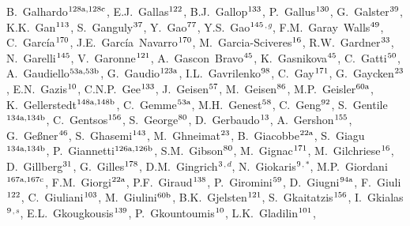\begin{flushleft}
B.~Galhardo$^\textrm{\scriptsize 128a,128c}$,
E.J.~Gallas$^\textrm{\scriptsize 122}$,
B.J.~Gallop$^\textrm{\scriptsize 133}$,
P.~Gallus$^\textrm{\scriptsize 130}$,
G.~Galster$^\textrm{\scriptsize 39}$,
K.K.~Gan$^\textrm{\scriptsize 113}$,
S.~Ganguly$^\textrm{\scriptsize 37}$,
Y.~Gao$^\textrm{\scriptsize 77}$,
Y.S.~Gao$^\textrm{\scriptsize 145}$$^{,g}$,
F.M.~Garay~Walls$^\textrm{\scriptsize 49}$,
C.~Garc\'ia$^\textrm{\scriptsize 170}$,
J.E.~Garc\'ia~Navarro$^\textrm{\scriptsize 170}$,
M.~Garcia-Sciveres$^\textrm{\scriptsize 16}$,
R.W.~Gardner$^\textrm{\scriptsize 33}$,
N.~Garelli$^\textrm{\scriptsize 145}$,
V.~Garonne$^\textrm{\scriptsize 121}$,
A.~Gascon~Bravo$^\textrm{\scriptsize 45}$,
K.~Gasnikova$^\textrm{\scriptsize 45}$,
C.~Gatti$^\textrm{\scriptsize 50}$,
A.~Gaudiello$^\textrm{\scriptsize 53a,53b}$,
G.~Gaudio$^\textrm{\scriptsize 123a}$,
I.L.~Gavrilenko$^\textrm{\scriptsize 98}$,
C.~Gay$^\textrm{\scriptsize 171}$,
G.~Gaycken$^\textrm{\scriptsize 23}$,
E.N.~Gazis$^\textrm{\scriptsize 10}$,
C.N.P.~Gee$^\textrm{\scriptsize 133}$,
J.~Geisen$^\textrm{\scriptsize 57}$,
M.~Geisen$^\textrm{\scriptsize 86}$,
M.P.~Geisler$^\textrm{\scriptsize 60a}$,
K.~Gellerstedt$^\textrm{\scriptsize 148a,148b}$,
C.~Gemme$^\textrm{\scriptsize 53a}$,
M.H.~Genest$^\textrm{\scriptsize 58}$,
C.~Geng$^\textrm{\scriptsize 92}$,
S.~Gentile$^\textrm{\scriptsize 134a,134b}$,
C.~Gentsos$^\textrm{\scriptsize 156}$,
S.~George$^\textrm{\scriptsize 80}$,
D.~Gerbaudo$^\textrm{\scriptsize 13}$,
A.~Gershon$^\textrm{\scriptsize 155}$,
G.~Ge\ss{}ner$^\textrm{\scriptsize 46}$,
S.~Ghasemi$^\textrm{\scriptsize 143}$,
M.~Ghneimat$^\textrm{\scriptsize 23}$,
B.~Giacobbe$^\textrm{\scriptsize 22a}$,
S.~Giagu$^\textrm{\scriptsize 134a,134b}$,
P.~Giannetti$^\textrm{\scriptsize 126a,126b}$,
S.M.~Gibson$^\textrm{\scriptsize 80}$,
M.~Gignac$^\textrm{\scriptsize 171}$,
M.~Gilchriese$^\textrm{\scriptsize 16}$,
D.~Gillberg$^\textrm{\scriptsize 31}$,
G.~Gilles$^\textrm{\scriptsize 178}$,
D.M.~Gingrich$^\textrm{\scriptsize 3}$$^{,d}$,
N.~Giokaris$^\textrm{\scriptsize 9}$$^{,*}$,
M.P.~Giordani$^\textrm{\scriptsize 167a,167c}$,
F.M.~Giorgi$^\textrm{\scriptsize 22a}$,
P.F.~Giraud$^\textrm{\scriptsize 138}$,
P.~Giromini$^\textrm{\scriptsize 59}$,
D.~Giugni$^\textrm{\scriptsize 94a}$,
F.~Giuli$^\textrm{\scriptsize 122}$,
C.~Giuliani$^\textrm{\scriptsize 103}$,
M.~Giulini$^\textrm{\scriptsize 60b}$,
B.K.~Gjelsten$^\textrm{\scriptsize 121}$,
S.~Gkaitatzis$^\textrm{\scriptsize 156}$,
I.~Gkialas$^\textrm{\scriptsize 9}$$^{,s}$,
E.L.~Gkougkousis$^\textrm{\scriptsize 139}$,
P.~Gkountoumis$^\textrm{\scriptsize 10}$,
L.K.~Gladilin$^\textrm{\scriptsize 101}$,

\end{flushleft}
